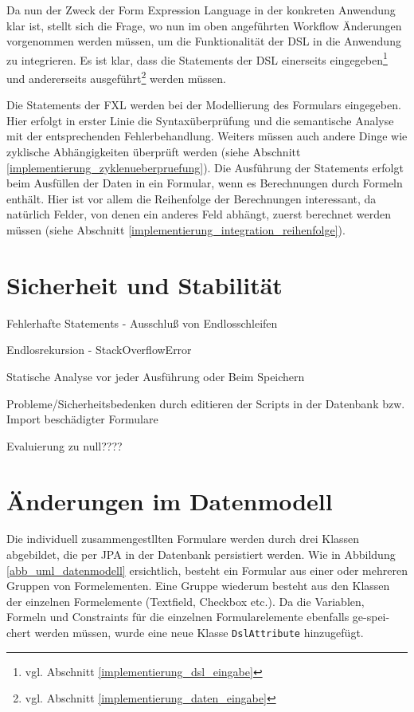 Da nun der Zweck der Form Expression Language in der konkreten Anwendung klar ist, stellt sich die Frage, wo nun im oben angeführten Workflow Än\-der\-ung\-en vorgenommen werden müssen, um die Funktionalität der DSL in die Anwendung zu integrieren. Es ist klar, dass die Statements der DSL einerseits eingegeben\footnote{vgl. Abschnitt \ref{implementierung_dsl_eingabe}  } und andererseits ausgeführt\footnote{vgl. Abschnitt \ref{implementierung_daten_eingabe} } werden müssen. 

Die Statements der FXL werden bei der Modellierung des Formulars eingegeben. Hier erfolgt in erster Linie die Syntaxüberprüfung und die semantische Analyse mit der ent\-sprech\-enden Fehlerbehandlung. Weiters müssen auch andere Dinge wie zyklische Abhängigkeiten überprüft werden (siehe Abschnitt \ref{implementierung_zyklenueberpruefung}). Die Aus\-führ\-ung der Statements erfolgt beim Ausfüllen der Daten in ein Formular, wenn es Berechnungen durch Formeln enthält. Hier ist vor allem die Reihenfolge der Berechnungen interessant, da natürlich Felder, von denen ein anderes Feld abhängt, zuerst berechnet werden müssen (siehe Abschnitt \ref{implementierung_integration_reihenfolge}).


\section{Sicherheit und Stabilität}

Fehlerhafte Statements - Ausschluß von Endlosschleifen

Endlosrekursion - StackOverflowError

Statische Analyse vor jeder Aus\-führ\-ung oder Beim Speichern

Probleme/Sicherheitsbedenken durch editieren der Scripts in der Datenbank bzw. Import beschädigter Formulare

Evaluierung zu null????




\section{Än\-der\-ung\-en im Datenmodell}

Die individuell zusammengestllten Formulare werden durch drei Klassen abgebildet, die per JPA in der Datenbank persistiert werden. Wie in Abbildung \ref{abb_uml_datenmodell} ersichtlich, besteht ein Formular aus einer oder mehreren Gruppen von Formelementen. Eine Gruppe wiederum besteht aus den Klassen der einzelnen Formelemente (Textfield, Checkbox etc.). Da die Variablen, Formeln und Constraints für die einzelnen Formularelemente ebenfalls ge-spei-chert werden müssen, wurde eine neue Klasse \texttt{DslAttribute} hinzugefügt.

